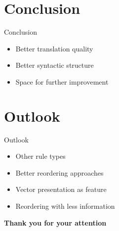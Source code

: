 \documentclass[18pt]{beamer}
\begin{document}
\section{Conclusion}
\begin{frame}{Conclusion}
\begin{itemize}
\item Better translation quality
\item Better syntactic structure
\item Space for further improvement
\end{itemize}
\end{frame}


\section{Outlook}
\begin{frame}{Outlook}
\begin{itemize}
\item Other rule types
\item Better reordering approaches
\item Vector presentation as feature
\item Reordering with less information
\end{itemize}
\end{frame}


\begin{frame}{\vphantom{A}}
\centering
{\LARGE \textbf{Thank you for your attention}}
\end{frame}
\end{document}

